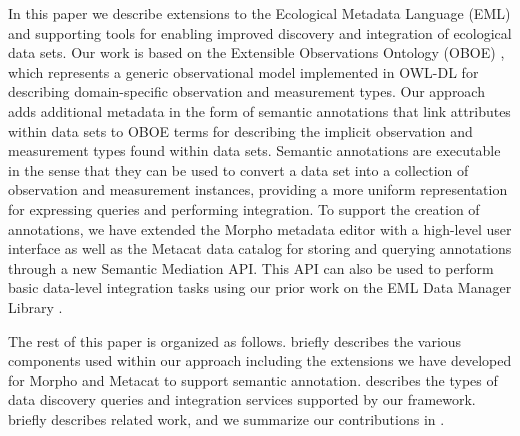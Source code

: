 In this paper we describe extensions to the Ecological Metadata
Language (EML) \cite{Fegraus07} and supporting tools for enabling
improved discovery and integration of ecological data sets. Our work
is based on the Extensible Observations Ontology (OBOE)
\cite{bowers08,madin07:_ontol_for_descr_and_synth}, which represents a
generic observational model implemented in OWL-DL \cite{owldl} for describing
domain-specific observation and measurement types. Our approach adds
additional metadata in the form of semantic annotations that link
attributes within data sets to OBOE terms for describing the implicit
observation and measurement types found within data sets. Semantic
annotations are executable in the sense that they can be used to
convert a data set into a collection of observation and measurement
instances, providing a more uniform representation for expressing
queries and performing integration.  To support the creation of
annotations, we have extended the Morpho metadata editor
\cite{metacat02:_manag_heter_ecolog_data_using_morph} with a
high-level user interface as well as the Metacat data catalog
\cite{berkley01:_metac} for storing and querying annotations through a
new Semantic Mediation API. This API can also be used to perform basic
data-level integration tasks using our prior work on the EML Data
Manager Library \cite{leinfelder10:_metad_driven_approac_to_loadin}.

The rest of this paper is organized as follows. 
briefly describes the various components used within our approach
including the extensions we have developed for Morpho and Metacat to
support semantic annotation.  describes the
types of data discovery queries and integration services supported by
our framework.  briefly describes related work,
and we summarize our contributions in .






